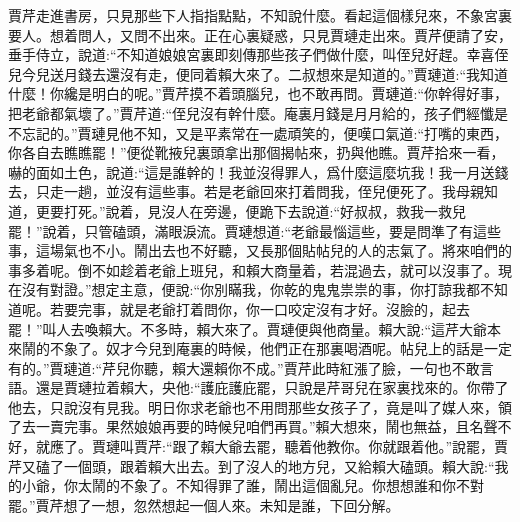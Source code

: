 \begin{parag}
    賈芹走進書房，只見那些下人指指點點，不知說什麼。看起這個樣兒來，不象宮裏要人。想着問人，又問不出來。正在心裏疑惑，只見賈璉走出來。賈芹便請了安，垂手侍立，說道:“不知道娘娘宮裏即刻傳那些孩子們做什麼，叫侄兒好趕。幸喜侄兒今兒送月錢去還沒有走，便同着賴大來了。二叔想來是知道的。”賈璉道:“我知道什麼！你纔是明白的呢。”賈芹摸不着頭腦兒，也不敢再問。賈璉道:“你幹得好事，把老爺都氣壞了。”賈芹道:“侄兒沒有幹什麼。庵裏月錢是月月給的，孩子們經懺是不忘記的。”賈璉見他不知，又是平素常在一處頑笑的，便嘆口氣道:“打嘴的東西，你各自去瞧瞧罷！”便從靴掖兒裏頭拿出那個揭帖來，扔與他瞧。賈芹拾來一看，嚇的面如土色，說道:“這是誰幹的！我並沒得罪人，爲什麼這麼坑我！我一月送錢去，只走一趟，並沒有這些事。若是老爺回來打着問我，侄兒便死了。我母親知道，更要打死。”說着，見沒人在旁邊，便跪下去說道:“好叔叔，救我一救兒罷！”說着，只管磕頭，滿眼淚流。賈璉想道:“老爺最惱這些，要是問準了有這些事，這場氣也不小。鬧出去也不好聽，又長那個貼帖兒的人的志氣了。將來咱們的事多着呢。倒不如趁着老爺上班兒，和賴大商量着，若混過去，就可以沒事了。現在沒有對證。”想定主意，便說:“你別瞞我，你乾的鬼鬼祟祟的事，你打諒我都不知道呢。若要完事，就是老爺打着問你，你一口咬定沒有才好。沒臉的，起去罷！”叫人去喚賴大。不多時，賴大來了。賈璉便與他商量。賴大說:“這芹大爺本來鬧的不象了。奴才今兒到庵裏的時候，他們正在那裏喝酒呢。帖兒上的話是一定有的。”賈璉道:“芹兒你聽，賴大還賴你不成。”賈芹此時紅漲了臉，一句也不敢言語。還是賈璉拉着賴大，央他:“護庇護庇罷，只說是芹哥兒在家裏找來的。你帶了他去，只說沒有見我。明日你求老爺也不用問那些女孩子了，竟是叫了媒人來，領了去一賣完事。果然娘娘再要的時候兒咱們再買。”賴大想來，鬧也無益，且名聲不好，就應了。賈璉叫賈芹:“跟了賴大爺去罷，聽着他教你。你就跟着他。”說罷，賈芹又磕了一個頭，跟着賴大出去。到了沒人的地方兒，又給賴大磕頭。賴大說:“我的小爺，你太鬧的不象了。不知得罪了誰，鬧出這個亂兒。你想想誰和你不對罷。”賈芹想了一想，忽然想起一個人來。未知是誰，下回分解。
\end{parag}